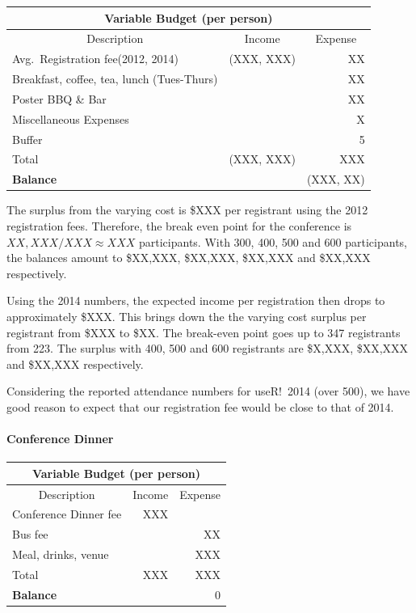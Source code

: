 \documentclass[11pt]{article}
\begin{document}
\begin{center}
\begin{tabular}{lrr}
  \multicolumn{3}{c}{\textbf{Variable Budget (per person)}}\\
  \hline
  \multicolumn{1}{c}{Description}
  &\multicolumn{1}{c}{Income}
  &\multicolumn{1}{c}{Expense}\\
  \hline
  Avg.~Registration fee\footnotemark(2012, 2014) &(XXX, XXX) &XX\\
  Breakfast, coffee, tea, lunch (Tues-Thurs) & &XX\\
  Poster BBQ \& Bar & &XX\\
  Miscellaneous Expenses & &X\\
  Buffer & &5\\
  \hline
  Total             &(XXX, XXX)  &XXX\\
  \hline
  \textbf{Balance}             & &(XXX, XX)\\
  \hline
\end{tabular}
\end{center}

The surplus from the varying cost is \$XXX per registrant using the
2012 registration fees. Therefore, the break even point for the
conference is $XX,XXX/XXX\approx XXX$ participants. With 300, 400, 500
and 600 participants, the balances amount to \$XX,XXX, \$XX,XXX,
\$XX,XXX and \$XX,XXX respectively.

Using the 2014 numbers, the expected income per registration then
drops to approximately \$XXX. This brings down the the varying cost
surplus per registrant from \$XXX to \$XX. The break-even point goes
up to 347 registrants from 223. The surplus with 400, 500 and 600
registrants are \$X,XXX, \$XX,XXX and \$XX,XXX respectively.

Considering the reported attendance numbers for useR!~2014 (over 500),
we have good reason to expect that our registration fee would be close
to that of 2014.

\paragraph{Conference Dinner}
\begin{center}
\begin{tabular}{lrr}
  \multicolumn{3}{c}{\textbf{Variable Budget (per person)}}\\
  \hline
  \multicolumn{1}{c}{Description}
  &\multicolumn{1}{c}{Income}
  &\multicolumn{1}{c}{Expense}\\
  \hline
  Conference Dinner fee &XXX &\\
  Bus fee & &XX\\
  Meal, drinks, venue & &XXX\\
  \hline
  Total             &XXX &XXX\\
  \hline
  \textbf{Balance}             & &0\\
  \hline
\end{tabular}
\end{center}
\end{document}
